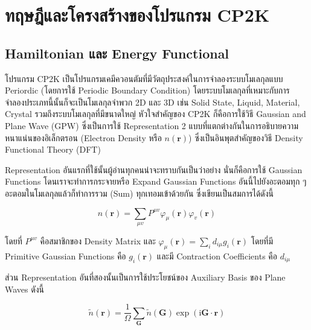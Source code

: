 

\chapter{ทฤษฎีและโครงสร้างของโปรแกรม CP2K}
\label{ap:cp2k}

\section{Hamiltonian และ Energy Functional}

โปรแกรม CP2K เป็นโปรแกรมเคมีควอนตัมที่มีวัตถุประสงค์ในการจำลองระบบโมเลกุลแบบ Periordic (โดยการใช้ Periodic Boundary Condition) 
โดยระบบโมเลกุลที่เหมาะกับการจำลองประเภทนี้นั้นก็จะเป็นโมเลกุลจำพวก 2D และ 3D เช่น Solid State, Liquid, Material, Crystal 
รวมถึงระบบโมเลกุลที่มีขนาดใหญ่ หัวใจสำคัญของ CP2K ก็คือการใช้วิธี Gaussian and Plane Wave (GPW) ซึ่งเป็นการใช้ Representation 2 
แบบที่แตกต่างกันในการอธิบายความหนาแน่นของอิเล็กตรอน (Electron Density หรือ $n(\boldsymbol{r})$) ซึ่งเป็นอินพุตสำคัญของวิธี 
Density Functional Theory (DFT) 

Representation อันแรกที่ใช้นั้นผู้อ่านทุกคนน่าจะทราบกันเป็นว่าอย่าง นั่นก็คือการใช้ Gaussian Functions โดนเราจะทำการกระจายหรือ Expand 
Gaussian Functions อันนี้ไปยังอะตอมทุก ๆ อะตอมในโมเลกุลแล้วก็ทำการรวม (Sum) ทุกเทอมเข้าด้วยกัน ซึ่งเขียนเป็นสมการได้ดังนี้ 

\begin{equation}
    n(\boldsymbol{r})
    =
    \sum_{\mu v} P^{\mu v} \varphi_\mu(\boldsymbol{r}) \varphi_v(\boldsymbol{r})
\end{equation}

\noindent โดยที่ $P^{\mu v}$ คือสมาชิกของ Density Matrix และ $\varphi_\mu(\boldsymbol{r}) = \sum_i d_{i \mu} 
g_i(\boldsymbol{r})$ โดยที่มี Primitive Gaussian Functions คือ $g_i(\boldsymbol{r})$ และมี Contraction Coefficients 
คือ $d_{i \mu}$ 

ส่วน Representation อันที่สองนั้นเป็นการใช้ประโยชน์ของ Auxiliary Basis ของ Plane Waves ดังนี้

\begin{equation}
    \tilde{n}(\boldsymbol{r})
    =
    \frac{1}{\Omega} \sum_{\boldsymbol{G}} \tilde{n}(\boldsymbol{G}) 
    \exp (\mathrm{i} \boldsymbol{G} \cdot \boldsymbol{r})
\end{equation}

